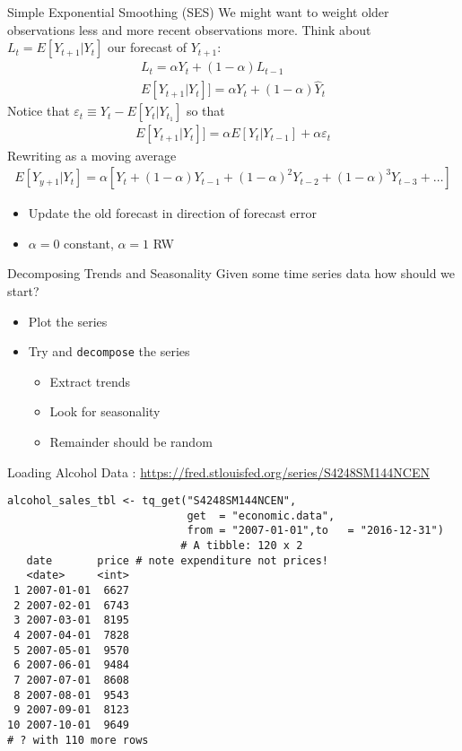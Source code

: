 \documentclass[aspectratio=169]{beamer}
\begin{document}
\begin{frame}{Simple Exponential Smoothing (SES)}
We might want to weight older observations less and more recent observations more. Think about $L_t=E[Y_{t+1}|Y_t]$ our forecast of $Y_{t+1}$:
\begin{align*}
L_t = \alpha Y_t + (1-\alpha) L_{t-1}\\
E[Y_{t+1}|Y_t]] = \alpha Y_t + (1-\alpha) \hat{Y}_{t}
\end{align*}
Notice that $\varepsilon_t \equiv Y_t - E[Y_t| Y_{t_1}]$ so that
\begin{align*}
E[Y_{t+1}|Y_t]] = \alpha E[Y_t| Y_{t-1}] + \alpha \varepsilon_t
\end{align*}
Rewriting as a \alert{moving average}
\begin{align*}
E[Y_{y+1} | Y_t] = \alpha [ Y_t + (1-\alpha)Y_{t-1} + (1-\alpha)^2 Y_{t-2} + (1-\alpha)^3 Y_{t-3} + \ldots]
\end{align*}
\begin{itemize}
    \item Update the old forecast in direction of forecast error
    \item $\alpha=0$ constant, $\alpha=1$ RW
\end{itemize}
\end{frame}


\begin{frame}{Decomposing Trends and Seasonality}
Given some time series data how should we start?
\begin{itemize}
\item Plot the series
\item Try and \texttt{decompose} the series
\begin{itemize}
\item Extract \alert{trends}
\item Look for \alert{seasonality}
\item Remainder should be \alert{random}
\end{itemize}
\end{itemize}
\end{frame}

\begin{frame}[fragile]{Loading Alcohol Data : }
\small
\url{https://fred.stlouisfed.org/series/S4248SM144NCEN}
\begin{verbatim}
alcohol_sales_tbl <- tq_get("S4248SM144NCEN", 
                            get  = "economic.data", 
                            from = "2007-01-01",to   = "2016-12-31")
                           # A tibble: 120 x 2
   date       price # note expenditure not prices!
   <date>     <int>
 1 2007-01-01  6627
 2 2007-02-01  6743
 3 2007-03-01  8195
 4 2007-04-01  7828
 5 2007-05-01  9570
 6 2007-06-01  9484
 7 2007-07-01  8608
 8 2007-08-01  9543
 9 2007-09-01  8123
10 2007-10-01  9649
# ? with 110 more rows
\end{verbatim}
\end{frame}
\end{document}
